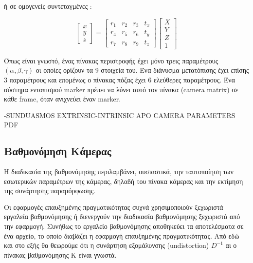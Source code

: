 ή σε ομογενείς συντεταγμένες :

\begin{equation}
\begin{bmatrix}
x \\ y \\ z
\end{bmatrix}
=
\begin{bmatrix}
r_{1} & r_{2} & r_{3} & t_{x}\\
r_{4} & r_{5} & r_{6} & t_{y}\\
r_{7} & r_{8} & r_{9} & t_{z}
\end{bmatrix}
\begin{bmatrix}
X\\
Y\\
Z\\
1
\end{bmatrix}
\end{equation}

Όπως είναι γνωστό, ένας πίνακας περιστροφής έχει μόνο τρεις παραμέτρους $(\alpha, \beta, \gamma)$ οι οποίες ορίζουν τα 9 στοιχεία του. Ένα διάνυσμα μετατόπισης έχει επίσης 3 παραμέτρους και επομένως ο πίνακας πόζας έχει 6 ελεύθερες παραμέτρους. Ένα σύστημα εντοπισμού marker πρέπει να λύνει αυτό τον πίνακα (camera matrix) σε κάθε frame, όταν ανιχνεύει έναν marker.



-SUNDUASMOS EXTRINSIC-INTRINSIC APO CAMERA PARAMETERS PDF





\subsection{Βαθμονόμηση Κάμερας}


Η διαδικασία της βαθμονόμησης περιλαμβάνει, ουσιαστικά, την ταυτοποίηση των εσωτερικών παραμέτρων της κάμερας, δηλαδή του πίνακα κάμερας και την εκτίμηση της συνάρτησης παραμόρφωσης.


Οι εφαρμογές επαυξημένης πραγματικότητας συχνά χρησιμοποιούν ξεχωριστά εργαλεία βαθμονόμησης ή διενεργούν την διαδικασία βαθμονόμησης ξεχωριστά από την εφαρμογή. Συνήθως το εργαλείο βαθμονόμησης αποθηκεύει τα αποτελέσματα σε ένα αρχείο, το οποίο διαβάζει η εφαρμογή επαυξημένης πραγματικότητας. Από εδώ και στο εξής θα θεωρούμε ότι η συνάρτηση εξομάλυνσης (undistortion) $D^{-1}$ αι ο πίνακας βαθμονόμησης Κ είναι γνωστά. 


